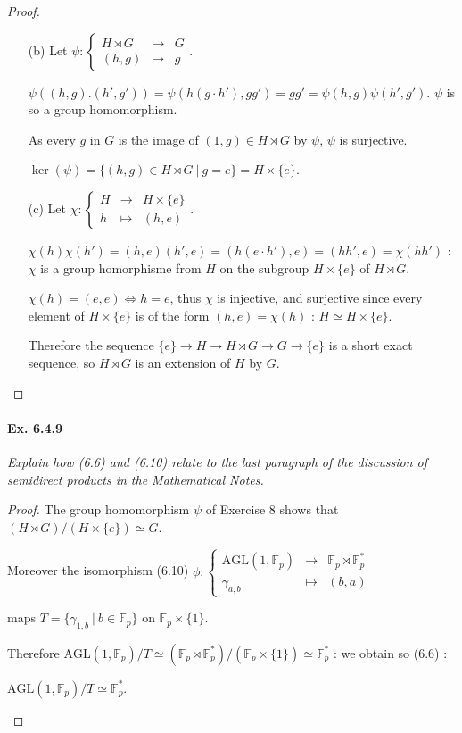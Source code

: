 \documentclass[11pt,a4paper]{article}
\newcommand{\F}{\mathbb{F}}
\begin{document}
\begin{proof}
\begin{enumerate}
\item[(b)]
Let
$
\psi : 
\left\{
\begin{array}{ccc}
  H\rtimes G &   \to & G  \\
  (h,g)& \mapsto   &  g 
\end{array}
\right.
$. 

$\psi((h,g).(h',g')) = \psi(h(g\cdot h'),gg') = gg' = \psi(h,g) \psi(h',g')$. $\psi$ is so a group homomorphism.

As every $g$ in $G$ is the image of $(1,g) \in   H\rtimes G$ by $\psi$, $\psi$ is surjective.

$\ker(\psi) = \{(h,g) \in   H\rtimes G \ \vert \ g=e\} = H \times \{e\}$.

\item[(c)]
Let
$
\chi : 
\left\{
\begin{array}{ccc}
  H &   \to & H \times \{e\}  \\
h& \mapsto   &  (h,e)
\end{array}
\right.
$. 

$\chi(h)\chi(h') = (h,e)(h',e) = (h (e\cdot h'), e) = (hh',e) = \chi(hh')$ : $\chi$ is a group homorphisme from $H$ on the subgroup $H\times \{e\}$ of $H \rtimes G$.

$\chi(h) = (e,e) \iff h=e$, thus $\chi$ is injective, and surjective since every element of $H\times\{e\}$ is of the form $(h,e) = \chi(h)$ : $H \simeq H\times \{e\}$.

Therefore the sequence  $\{e\} \to H \to H\rtimes G \to G \to \{e\}$ is a short exact sequence, so $H\rtimes G$ is an extension of $H$ by $G$.
\end{enumerate}
\end{proof}

\paragraph{Ex. 6.4.9}

{\it Explain how (6.6) and (6.10) relate to the last paragraph of the discussion of semidirect products in the Mathematical Notes.
}

\begin{proof}
The group homomorphism $\psi$ of Exercise 8 shows that $(H\rtimes G) / (H \times\{e\}) \simeq G$.

Moreover the isomorphism (6.10)
$
\phi : 
\left\{
\begin{array}{ccc}
  \mathrm{AGL}(1,\F_p)  &   \to & \F_p \rtimes \F_p^*  \\
 \gamma_{a,b}& \mapsto   &  (b,a) 
\end{array}
\right.
$

maps $T = \{\gamma_{1,b} \ \vert \ b \in \F_p\}$ on $\F_p \times \{1\}$.
 
Therefore $\mathrm{AGL}(1,\F_p)/T \simeq (\F_p \rtimes \F_p^*)/(\F_p \times \{1\}) \simeq \F_p^*$ : we obtain so (6.6) :
 \begin{center}
  $\mathrm{AGL}(1,\F_p)/T \simeq \F_p^*$.
\end{center}
\end{proof}
\end{document}

